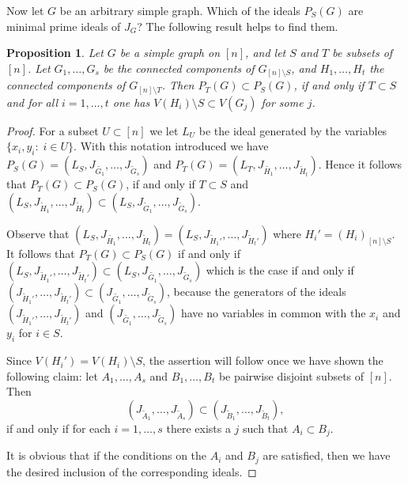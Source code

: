 \documentclass[11pt]{amsart}
\let\:=\colon
\newtheorem{Proposition}[Theorem]{Proposition}
\begin{document}
Now let $G$ be an arbitrary simple graph. Which of the ideals $P_S(G)$ are minimal prime ideals of $J_G$? The following result helps to find them.
\begin{Proposition}
\label{minimal}
Let $G$ be a simple graph on $[n]$, and let $S$ and  $T$  be subsets of $[n]$. Let $G_1,\ldots,G_s$  be the connected components of $G_{[n]\setminus S}$, and $H_1,\ldots, H_t$ the connected components of $G_{[n]\setminus T}$.
Then
$P_T(G)\subset P_S(G)$, if and only if  $T\subset S$ and for all $i=1,\ldots,t$ one has $V(H_i)\setminus S\subset V(G_j)$ for some $j$.
\end{Proposition}


\begin{proof}
For a subset $U\subset  [n]$ we let $L_U$ be the ideal generated by the variables $\{x_i,y_i\: \; i\in U\}$. With this notation introduced we have
$P_S(G)=(L_S, J_{\tilde{G_1}},\ldots, J_{\tilde{G}_{s}})$ and $P_T(G)=(L_T, J_{\tilde{H_1}},\ldots, J_{\tilde{H}_{t}})$. Hence  it follows that $P_T(G)\subset P_S(G)$, if and only if $T\subset S$ and $(L_S,  J_{\tilde{H}_1},\ldots, J_{\tilde{H}_{t}})\subset (L_S,J_{\tilde{G}_1},\ldots, J_{\tilde{G}_{s}})$.

Observe that  $(L_S, J_{\tilde{H_1}},\ldots, J_{\tilde{H}_{t}})=(L_S, J_{\tilde{H}_1'},\ldots, J_{\tilde{H}_t'})$ where $H_i'=(H_i)_{[n]\setminus S}$. It follows  that $P_T(G)\subset P_S(G)$ if and only if  $(L_S, J_{\tilde{H}_1'},\ldots, J_{\tilde{H}_t'})\subset (L_S, J_{\tilde{G_1}},\ldots, J_{\tilde{G}_{s}})$ which is the case if and only if $(J_{\tilde{H}_1'},\ldots, J_{\tilde{H}_t'})\subset (J_{\tilde{G_1}},\ldots, J_{\tilde{G}_{s}})$, because the generators of the ideals  $(J_{\tilde{H}_1'},\ldots, J_{\tilde{H}_t'})$ and $(J_{\tilde{G_1}},\ldots, J_{\tilde{G}_{s}})$ have no variables in common with the $x_i$ and $y_i$ for $i\in S$.

Since $V(H_i')=V(H_i)\setminus S$, the assertion will follow once we have shown the following claim: let $A_1, \ldots, A_s$ and $B_1,\ldots,B_t$ be pairwise disjoint  subsets of $[n]$. Then $$(J_{\tilde{A}_1},\ldots, J_{\tilde{A}_s})\subset (J_{\tilde{B}_1},\ldots, J_{\tilde{B}_t}),$$ if and only if for each $i=1,\ldots, s$ there exists a $j$ such that $A_i\subset B_j$.

It is obvious that if the conditions on the $A_i$ and $B_j$ are satisfied, then we have the desired inclusion of the corresponding ideals.


\end{proof}
\end{document}
